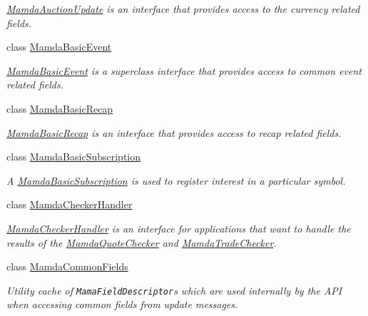 \begin{CompactItemize}
\begin{CompactList}\small\item\em \hyperlink{classWombat_1_1MamdaAuctionUpdate}{Mamda\-Auction\-Update} is an interface that provides access to the currency related fields. \item\end{CompactList}\item 
class \hyperlink{classWombat_1_1MamdaBasicEvent}{Mamda\-Basic\-Event}
\begin{CompactList}\small\item\em \hyperlink{classWombat_1_1MamdaBasicEvent}{Mamda\-Basic\-Event} is a superclass interface that provides access to common event related fields. \item\end{CompactList}\item 
class \hyperlink{classWombat_1_1MamdaBasicRecap}{Mamda\-Basic\-Recap}
\begin{CompactList}\small\item\em \hyperlink{classWombat_1_1MamdaBasicRecap}{Mamda\-Basic\-Recap} is an interface that provides access to recap related fields. \item\end{CompactList}\item 
class \hyperlink{classWombat_1_1MamdaBasicSubscription}{Mamda\-Basic\-Subscription}
\begin{CompactList}\small\item\em A \hyperlink{classWombat_1_1MamdaBasicSubscription}{Mamda\-Basic\-Subscription} is used to register interest in a particular symbol. \item\end{CompactList}\item 
class \hyperlink{classWombat_1_1MamdaCheckerHandler}{Mamda\-Checker\-Handler}
\begin{CompactList}\small\item\em \hyperlink{classWombat_1_1MamdaCheckerHandler}{Mamda\-Checker\-Handler} is an interface for applications that want to handle the results of the \hyperlink{classWombat_1_1MamdaQuoteChecker}{Mamda\-Quote\-Checker} and \hyperlink{classWombat_1_1MamdaTradeChecker}{Mamda\-Trade\-Checker}. \item\end{CompactList}\item 
class \hyperlink{classWombat_1_1MamdaCommonFields}{Mamda\-Common\-Fields}
\begin{CompactList}\small\item\em Utility cache of {\tt Mama\-Field\-Descriptor}s which are used internally by the API when accessing common fields from update messages. \item\end{CompactList}\item 

\end{CompactItemize}
